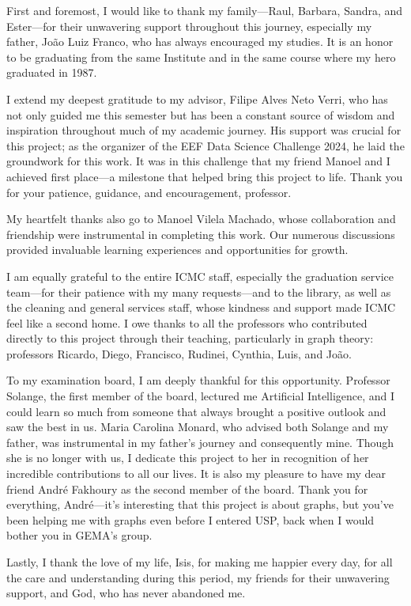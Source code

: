 \begin{agradecimentos}

    First and foremost, I would like to thank my family—Raul, Barbara, Sandra, and Ester—for their unwavering support throughout this journey, especially my father, João Luiz Franco, who has always encouraged my studies. It is an honor to be graduating from the same Institute and in the same course where my hero graduated in 1987. 

    I extend my deepest gratitude to my advisor, Filipe Alves Neto Verri, who has not only guided me this semester but has been a constant source of wisdom and inspiration throughout much of my academic journey. His support was crucial for this project; as the organizer of the EEF Data Science Challenge 2024, he laid the groundwork for this work. It was in this challenge that my friend Manoel and I achieved first place—a milestone that helped bring this project to life. Thank you for your patience, guidance, and encouragement, professor.

    My heartfelt thanks also go to Manoel Vilela Machado, whose collaboration and friendship were instrumental in completing this work. Our numerous discussions provided invaluable learning experiences and opportunities for growth.

    I am equally grateful to the entire ICMC staff, especially the graduation service team—for their patience with my many requests—and to the library, as well as the cleaning and general services staff, whose kindness and support made ICMC feel like a second home. I owe thanks to all the professors who contributed directly to this project through their teaching, particularly in graph theory: professors Ricardo, Diego, Francisco, Rudinei, Cynthia, Luis, and João.

    To my examination board, I am deeply thankful for this opportunity. Professor Solange, the first member of the board, lectured me Artificial Intelligence, and I could learn so much from someone that always brought a positive outlook and saw the best in us. Maria Carolina Monard, who advised both Solange and my father, was instrumental in my father's journey and consequently mine. Though she is no longer with us, I dedicate this project to her in recognition of her incredible contributions to all our lives. It is also my pleasure to have my dear friend André Fakhoury as the second member of the board. Thank you for everything, André—it's interesting that this project is about graphs, but you've been helping me with graphs even before I entered USP, back when I would bother you in GEMA's group.

    Lastly, I thank the love of my life, Isis, for making me happier every day, for all the care and understanding during this period, my friends for their unwavering support, and God, who has never abandoned me.

\end{agradecimentos}
